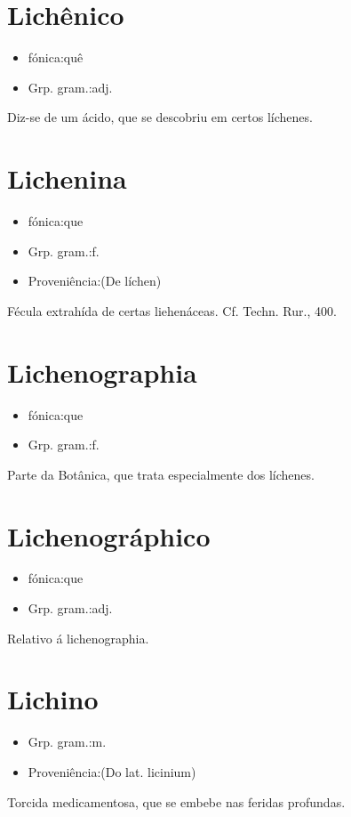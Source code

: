 \section{Lichênico}
\begin{itemize}
\item {fónica:quê}
\end{itemize}
\begin{itemize}
\item {Grp. gram.:adj.}
\end{itemize}
Diz-se de um ácido, que se descobriu em certos líchenes.
\section{Lichenina}
\begin{itemize}
\item {fónica:que}
\end{itemize}
\begin{itemize}
\item {Grp. gram.:f.}
\end{itemize}
\begin{itemize}
\item {Proveniência:(De \textunderscore líchen\textunderscore )}
\end{itemize}
Fécula extrahída de certas liehenáceas. Cf. \textunderscore Techn. Rur.\textunderscore , 400.
\section{Lichenographia}
\begin{itemize}
\item {fónica:que}
\end{itemize}
\begin{itemize}
\item {Grp. gram.:f.}
\end{itemize}
Parte da Botânica, que trata especialmente dos líchenes.
\section{Lichenográphico}
\begin{itemize}
\item {fónica:que}
\end{itemize}
\begin{itemize}
\item {Grp. gram.:adj.}
\end{itemize}
Relativo á lichenographia.
\section{Lichino}
\begin{itemize}
\item {Grp. gram.:m.}
\end{itemize}
\begin{itemize}
\item {Proveniência:(Do lat. \textunderscore licinium\textunderscore )}
\end{itemize}
Torcida medicamentosa, que se embebe nas feridas profundas.
